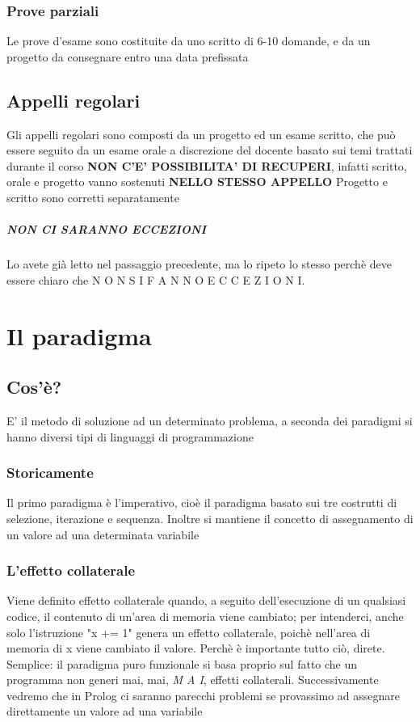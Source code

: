 \documentclass[12pt, a4paper, openany, oneside]{book}
\begin{document}
\subsection{Prove parziali}
\label{sub:prove_parziali}
Le prove d'esame sono costituite da uno scritto di 6-10 domande, e da un progetto da consegnare entro una data prefissata
\section{Appelli regolari}
\label{sec:appelli_regolari}
Gli appelli regolari sono composti da un progetto ed un esame scritto, che può
essere seguito da un esame orale a discrezione del docente basato sui temi trattati durante il corso
\newline
\textbf{NON C'E' POSSIBILITA' DI RECUPERI}, infatti scritto, orale e progetto vanno sostenuti \color{red} \textbf{NELLO STESSO APPELLO} \color{black}
\newline
Progetto e scritto sono corretti separatamente
\paragraph{NON CI SARANNO ECCEZIONI}
\label{par:non_ci_saranno_eccezioni}
Lo avete già letto nel passaggio precedente, ma lo ripeto lo stesso perchè 
deve essere chiaro che N O N  S I  F A N N O  E C C E Z I O N I.
\chapter{Il paradigma}
\section{Cos'è?}
E' il metodo di soluzione ad un determinato problema, a seconda dei paradigmi si
hanno diversi tipi di linguaggi di programmazione
\subsection{Storicamente}
Il primo paradigma è l'imperativo, cioè il paradigma basato sui tre costrutti
di selezione, iterazione e sequenza. \newline
Inoltre si mantiene il concetto di assegnamento di un valore ad una determinata variabile
\subsection{L'effetto collaterale}
Viene definito effetto collaterale quando, a seguito dell'esecuzione di un qualsiasi
codice, il contenuto di un'area di memoria viene cambiato; per intenderci, anche
solo l'istruzione "x += 1" genera un effetto collaterale, poichè nell'area di 
memoria di x viene cambiato il valore. \newline
Perchè è importante tutto ciò, direte. Semplice: il paradigma puro funzionale si 
basa proprio sul fatto che un programma non generi mai, mai, \emph{M A I}, effetti 
collaterali.
Successivamente vedremo che in Prolog ci saranno parecchi problemi se provassimo
ad assegnare direttamente un valore ad una variabile
\end{document}
